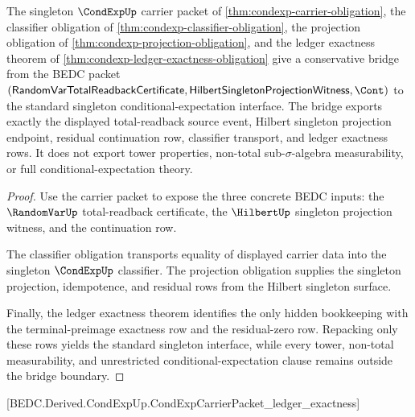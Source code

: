 \begin{theorem}
\label{thm:condexp-singleton-standard-bridge-boundary}
The singleton $\CondExpUp$ carrier packet of
\autoref{thm:condexp-carrier-obligation}, the classifier obligation of
\autoref{thm:condexp-classifier-obligation}, the projection obligation of
\autoref{thm:condexp-projection-obligation}, and the ledger exactness theorem of
\autoref{thm:condexp-ledger-exactness-obligation} give a conservative bridge
from the BEDC packet
$(\mathsf{RandomVarTotalReadbackCertificate},
\mathsf{HilbertSingletonProjectionWitness}, \Cont)$ to the standard singleton
conditional-expectation interface. The bridge exports exactly the displayed
total-readback source event, Hilbert singleton projection endpoint, residual
continuation row, classifier transport, and ledger exactness rows. It does not
export tower properties, non-total sub-$\sigma$-algebra measurability, or full
conditional-expectation theory.
\end{theorem}
\begin{proof}
Use the carrier packet to expose the three concrete BEDC inputs: the
$\RandomVarUp$ total-readback certificate, the $\HilbertUp$ singleton
projection witness, and the continuation row.

The classifier obligation transports equality of displayed carrier data into
the singleton $\CondExpUp$ classifier. The projection obligation supplies the
singleton projection, idempotence, and residual rows from the Hilbert
singleton surface.

Finally, the ledger exactness theorem identifies the only hidden bookkeeping
with the terminal-preimage exactness row and the residual-zero row. Repacking
only these rows yields the standard singleton interface, while every tower,
non-total measurability, and unrestricted conditional-expectation clause
remains outside the bridge boundary.
\end{proof}

[BEDC.Derived.CondExpUp.CondExpCarrierPacket\_ledger\_exactness]

